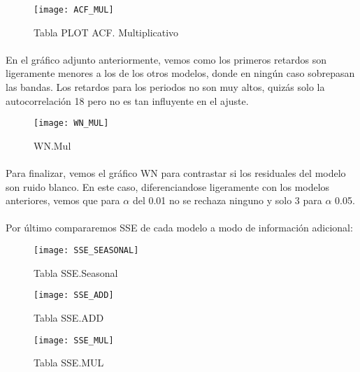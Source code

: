 \documentclass[a4paper, spanish]{article}
\begin{document}
      \begin{figure}[h!]
        \centering
        \texttt{[image: ACF\_MUL]}
        \caption{Tabla PLOT ACF. Multiplicativo}
        \label{}
      \end{figure}

      \paragraph{}
      En el gráfico adjunto anteriormente, vemos como los primeros retardos son ligeramente menores a los de los otros modelos, donde en ningún caso sobrepasan las bandas. Los retardos para los periodos no son muy altos, quizás solo la autocorrelación 18 pero no es tan influyente en el ajuste.

      \begin{figure}[h!]
        \centering
        \texttt{[image: WN\_MUL]}
        \caption{WN.Mul}
        \label{}
      \end{figure}

      \paragraph{}
      Para finalizar, vemos el gráfico WN para contrastar si los residuales del modelo son ruido blanco. En este caso, diferenciandose ligeramente con los modelos anteriores, vemos que para $\alpha$ del 0.01 no se rechaza ninguno y solo 3 para $\alpha$ 0.05.

      \paragraph{}
      Por último compararemos SSE de cada modelo a modo de información adicional:

      \begin{figure}[h!]
        \centering
        \texttt{[image: SSE\_SEASONAL]}
        \caption{Tabla SSE.Seasonal}
        \label{}
      \end{figure}

      \begin{figure}[h!]
        \centering
        \texttt{[image: SSE\_ADD]}
        \caption{Tabla SSE.ADD}
        \label{}
      \end{figure}

      \begin{figure}[h!]
        \centering
        \texttt{[image: SSE\_MUL]}
        \caption{Tabla SSE.MUL}
        \label{}
      \end{figure}
\end{document}
